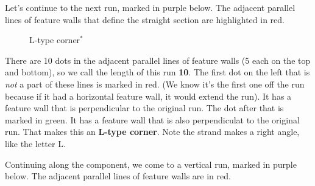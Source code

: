 \documentclass[openany]{book}
\newcommand{\gen}{\hyperref[generated]{$^*$}}%
\begin{document}

Let's continue to the next run, marked in purple below. The adjacent parallel lines of feature walls that define the straight section are highlighted in red.



\begin{figure}[H]\centering
{}
\caption{L-type corner\gen}
\end{figure}
There are 10 dots in the adjacent parallel lines of feature walls (5 each on the top and bottom), so we call the length of this run \textbf{10}. The first dot on the left that is \textit{not} a part of these lines is marked in red.  (We know it's the first one off the run because if it had a horizontal feature wall, it would extend the run). It has a feature wall that is perpendicular to the original run. The dot after that is marked in green. It has a feature wall that is also perpendiculat to the original run. That makes this an \textbf{L-type corner}. Note the strand makes a right angle, like the letter L.
\medskip

Continuing along the component, we come to a vertical run, marked in purple below. The adjacent parallel lines of feature walls are in red.
\end{document}
